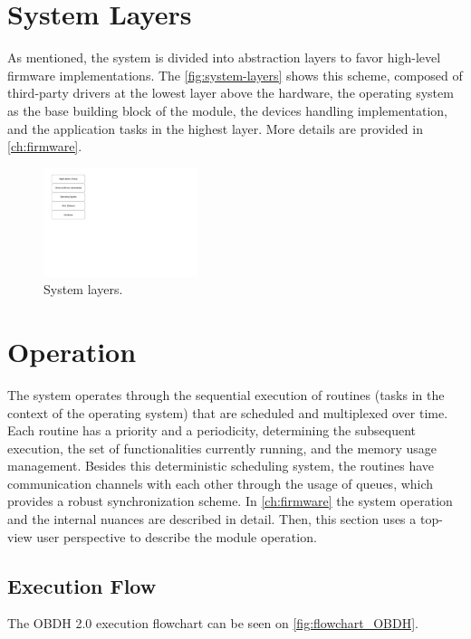 \section{System Layers}

As mentioned, the system is divided into abstraction layers to favor high-level firmware implementations. The \autoref{fig:system-layers} shows this scheme, composed of third-party drivers at the lowest layer above the hardware, the operating system as the base building block of the module, the devices handling implementation, and the application tasks in the highest layer. More details are provided in  \autoref{ch:firmware}.

\begin{figure}[!ht]
    \begin{center}
        \includegraphics[width=0.4\textwidth]{figures/system_layers.pdf}
        \caption{System layers.}
        \label{fig:system-layers}
    \end{center}
\end{figure}

\section{Operation}

The system operates through the sequential execution of routines (tasks in the context of the operating system) that are scheduled and multiplexed over time. Each routine has a priority and a periodicity, determining the subsequent execution, the set of functionalities currently running, and the memory usage management. Besides this deterministic scheduling system, the routines have communication channels with each other through the usage of queues, which provides a robust synchronization scheme. In \autoref{ch:firmware} the system operation and the internal nuances are described in detail. Then, this section uses a top-view user perspective to describe the module operation.

\subsection{Execution Flow}
The OBDH 2.0 execution flowchart can be seen on \autoref{fig:flowchart_OBDH}.

